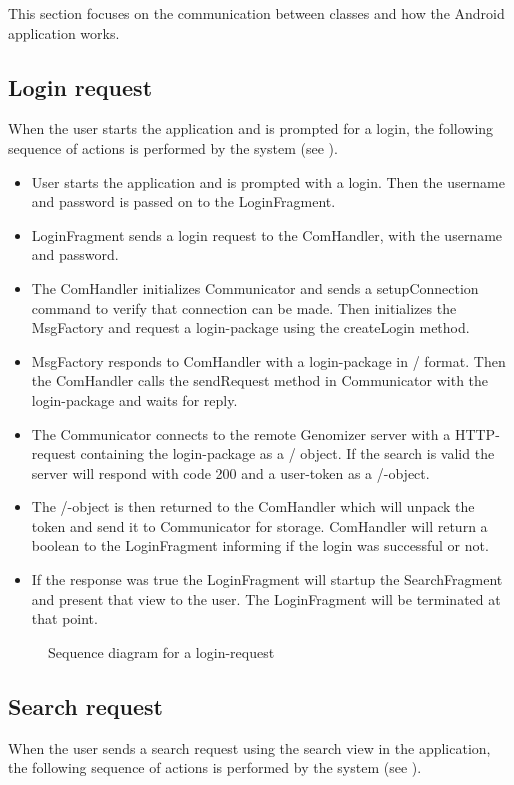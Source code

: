 This section focuses on the communication  between classes and how the Android application works.
\subsection{Login request}
	When the user starts the application and is prompted for a login, the following sequence of actions is performed by the system (see ).
	
	\begin{itemize}
		\item
			User starts the application and is prompted with a login.
			Then the username and password is passed on to the LoginFragment.
		\item
			LoginFragment sends a login request to the ComHandler, with the username and password.
		\item
			The ComHandler initializes Communicator and sends a setupConnection command to verify that connection can be made.
			Then initializes the MsgFactory and request a login-package using the createLogin method.
		\item
			MsgFactory responds to ComHandler with a login-package in \json/ format.
			Then the ComHandler calls the sendRequest method in Communicator with the login-package and waits for reply.
		\item
			The Communicator connects to the remote Genomizer server with a HTTP-request containing the login-package as a \json/ object.
			If the search is valid the server will respond with code 200 and a user-token as a \json/-object.
		\item
			The \json/-object is then returned to the ComHandler which will unpack the token and send it to Communicator for storage.
			ComHandler will return a boolean to the LoginFragment informing if the login was successful or not.
		\item 
			If the response was true the LoginFragment will startup the SearchFragment and present that view to the user.
			The LoginFragment will be terminated at that point. 
			
	\end{itemize}

	\begin{figure}[h!]
		\caption{Sequence diagram for a login-request}
		\label{fig:and_loginseq}
	\end{figure}
	\FloatBarrier
\subsection{Search request}
	When the user sends a search request using the search view in the application, the following sequence of actions is performed by the system
	(see ).
	
